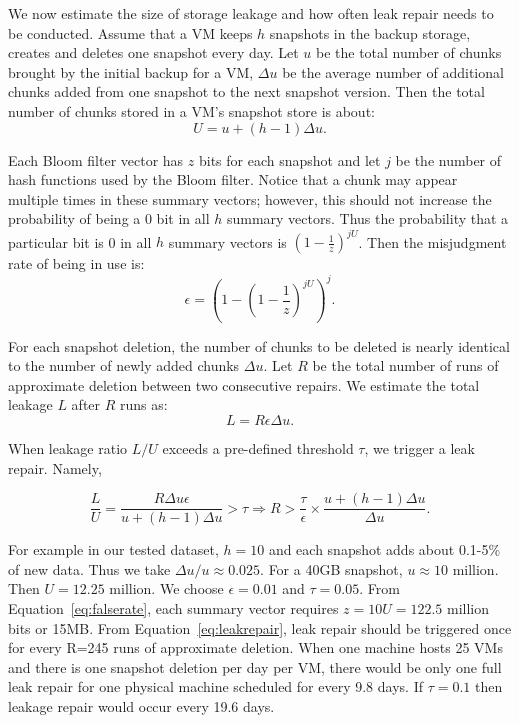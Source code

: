 We now estimate the size of storage leakage and how often leak repair needs to be conducted.
Assume that  a VM keeps $h$ snapshots in the backup storage, creates and deletes one snapshot
every day. Let $u$ be the total number of chunks brought by the initial backup for a VM, $\Delta u$ be the average
number of additional chunks added from one snapshot to the next snapshot version. Then the total number of 
chunks stored in a VM's snapshot store is about:
\[
U = u + (h-1)\Delta u.
\]

Each Bloom filter vector has  $z$ bits for each snapshot and let $j$ be the number of hash functions used by the
Bloom filter.  Notice that a chunk may appear multiple times in these summary vectors; however, this should not 
increase the probability of being a 0 bit in all $h$ summary vectors.
Thus the probability that a particular bit is 0  in all $h$ summary vectors is  
$(1- \frac{1}{z}) ^{j U}$. 
Then the misjudgment rate of being in use  is: 
\begin{equation}
\label{eq:falserate}
\epsilon = (1-(1-\frac{1}{z})^{jU})^j.
\end{equation}

For each snapshot deletion, the number of chunks to be deleted is nearly identical to the number of
newly added chunks $\Delta u$. 
Let $R$ be the total number of runs of approximate deletion between two consecutive 
repairs. We estimate  the total leakage $L$ after $R$ runs as:
\[
L = R \epsilon \Delta u.
\]

When leakage ratio $L/U$ exceeds a pre-defined threshold $\tau$, we trigger a leak repair. Namely,

\begin{equation}
\label{eq:leakrepair}
\frac{L}{U} = \frac{R \Delta u \epsilon}{u+(h-1)\Delta u } > \tau 
\Longrightarrow R > \frac{\tau}{\epsilon}\times\frac{u + (h-1)\Delta u}{\Delta u}.
\end{equation}

For example in our tested dataset,  
$h=10$ and each snapshot adds
about 0.1-5\% of new data. Thus we take ${\Delta u}/{u} \approx 0.025$. For a 40GB snapshot, $u\approx  10$ million.
Then $U=12.25$ million.
We choose  $\epsilon = 0.01$ and $\tau=0.05$.  From Equation~\ref{eq:falserate}, 
each summary vector requires $z=10U=122.5$ million bits or 15MB. From Equation~\ref{eq:leakrepair}, 
leak repair should be triggered once for every R=245 runs of approximate deletion. 
When one machine hosts 25 VMs and there is one snapshot deletion per day per VM, there would be 
only one full leak repair for one physical machine scheduled for every 9.8 days. 
If $\tau = 0.1$ then leakage repair would occur every 19.6 days.


